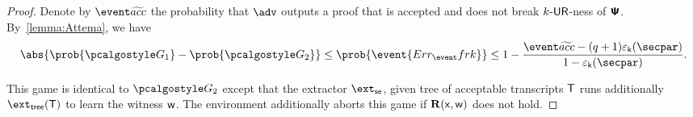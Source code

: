 \begin{proof}
%	
	Denote by $\waccProb$ the probability that $\advse$ outputs a proof that is accepted
	and does not break ${k\text{-}\mathsf{UR}}$-ness of $\bm{\mathsf{\Psi}}$. By~\cref{lemma:Attema}, we have 
		\begin{equation}
		\abs{\prob{\game{1}} - \prob{\game{2}}} \leq \prob{\event{\errfrk}} \leq 1 - \frac{\waccProb - (q + 1) \epsk(\secpar)} {1 -
			\epsk(\secpar)}.
		\end{equation}
	
	 This game is identical to $\game{2}$ except that the extractor $\extse$,
	given tree of acceptable transcripts $\mathsf{T}$ runs additionally $\extt (\tree)$ to
	learn the witness $\mathsf{w}$. The environment additionally aborts this game if
	$\mathbf{R}(\mathsf{x}, \mathsf{w})$ does not hold.
	

\end{proof}
